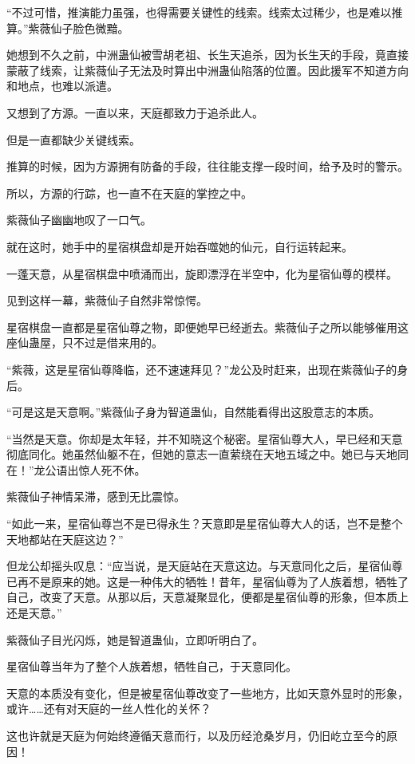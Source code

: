 \begin{this_body}
“不过可惜，推演能力虽强，也得需要关键性的线索。线索太过稀少，也是难以推算。”紫薇仙子脸色微黯。

她想到不久之前，中洲蛊仙被雪胡老祖、长生天追杀，因为长生天的手段，竟直接蒙蔽了线索，让紫薇仙子无法及时算出中洲蛊仙陷落的位置。因此援军不知道方向和地点，也难以派遣。

又想到了方源。一直以来，天庭都致力于追杀此人。

但是一直都缺少关键线索。

推算的时候，因为方源拥有防备的手段，往往能支撑一段时间，给予及时的警示。

所以，方源的行踪，也一直不在天庭的掌控之中。

紫薇仙子幽幽地叹了一口气。

就在这时，她手中的星宿棋盘却是开始吞噬她的仙元，自行运转起来。

一蓬天意，从星宿棋盘中喷涌而出，旋即漂浮在半空中，化为星宿仙尊的模样。

见到这样一幕，紫薇仙子自然非常惊愕。

星宿棋盘一直都是星宿仙尊之物，即便她早已经逝去。紫薇仙子之所以能够催用这座仙蛊屋，只不过是借来用的。

“紫薇，这是星宿仙尊降临，还不速速拜见？”龙公及时赶来，出现在紫薇仙子的身后。

“可是这是天意啊。”紫薇仙子身为智道蛊仙，自然能看得出这股意志的本质。

“当然是天意。你却是太年轻，并不知晓这个秘密。星宿仙尊大人，早已经和天意彻底同化。她虽然仙躯不在，但她的意志一直萦绕在天地五域之中。她已与天地同在！”龙公语出惊人死不休。

紫薇仙子神情呆滞，感到无比震惊。

“如此一来，星宿仙尊岂不是已得永生？天意即是星宿仙尊大人的话，岂不是整个天地都站在天庭这边？”

但龙公却摇头叹息：“应当说，是天庭站在天意这边。与天意同化之后，星宿仙尊已再不是原来的她。这是一种伟大的牺牲！昔年，星宿仙尊为了人族着想，牺牲了自己，改变了天意。从那以后，天意凝聚显化，便都是星宿仙尊的形象，但本质上还是天意。”

紫薇仙子目光闪烁，她是智道蛊仙，立即听明白了。

星宿仙尊当年为了整个人族着想，牺牲自己，于天意同化。

天意的本质没有变化，但是被星宿仙尊改变了一些地方，比如天意外显时的形象，或许……还有对天庭的一丝人性化的关怀？

这也许就是天庭为何始终遵循天意而行，以及历经沧桑岁月，仍旧屹立至今的原因！


\end{this_body}
